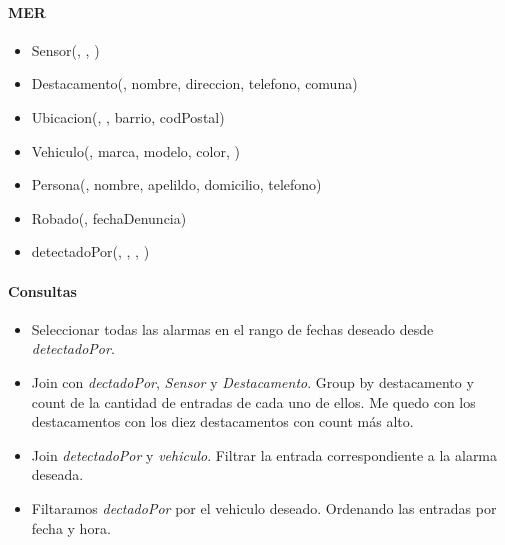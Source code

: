\begin{multicols}{2}
	\paragraph{MER}
	\begin{itemize}
		\item[] Sensor(, , )
		\item[] Destacamento(, nombre, direccion, telefono, comuna)
		\item[] Ubicacion(, , barrio, codPostal)
		\item[] Vehiculo(, marca, modelo, color, )
		\item[] Persona(, nombre, apelildo, domicilio, telefono)
		\item[] Robado(, fechaDenuncia)
		\item[] detectadoPor(, , , )
	\end{itemize}
	
	\columnbreak
	
	\paragraph{Consultas}
	\begin{itemize}
		\item Seleccionar todas las alarmas en el rango de fechas deseado desde \textit{detectadoPor}.
		\item Join con \textit{dectadoPor}, \textit{Sensor} y \textit{Destacamento}. Group by destacamento y count de la cantidad de entradas de cada uno de ellos. Me quedo con los destacamentos con los diez destacamentos con count más alto.
		\item Join \textit{detectadoPor} y \textit{vehiculo}. Filtrar la entrada correspondiente a la alarma deseada.
		\item Filtaramos \textit{dectadoPor} por el vehiculo deseado. Ordenando las entradas por fecha y hora.
	\end{itemize}
\end{multicols}
